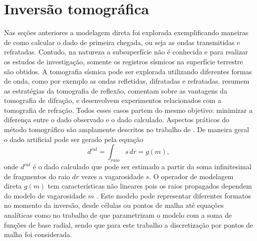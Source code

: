 \section{Inversão tomográfica}

Nas seções anteriores a modelagem direta foi explorada exemplificando maneiras de como calcular o dado de primeira chegada, ou seja as ondas transmitidas e refratadas. Contudo, na natureza a subsuperfície não é conhecida e para realizar os estudos de investigação, somente os registros sísmicos na superfície terrestre são obtidos. A tomografia sísmica pode ser explorada utilizando diferentes formas de onda, como por exemplo as ondas refletidas, difratadas e refratadas.  resumem as estratégias da tomografia de reflexão,  comentam sobre as vantagens da tomografia de difração,  e  desenvolvem experimentos relacionados com a tomografia de refração. Todos esses casos partem do mesmo objetivo: minimizar a diferença entre o dado observado e o dado calculado.  Aspectos práticos do método tomográfico são amplamente descritos no trabalho de . De maneira geral o dado artificial pode ser gerado pela equação
\begin{equation}
	d^{cal} = \displaystyle\int_{raio} s\,dr = g(m),
\end{equation}
\noindent onde $d^{cal}$ é o dado calculado que pode ser estimado a partir da soma infinitesimal de fragmentos do raio $dr$ vezes a vagarosidade $s$. O operador de modelagem direta $g(m)$ tem características não lineares pois os raios propagados dependem do modelo de vagarosidade $m$ \cite{seo2012nonlinear}. Este modelo pode representar diferentes formatos no momento da inversão, desde células ou pontos de malha até equações analíticas como no trabalho de  que parametrizam o modelo com a soma de funções de base radial, sendo que para este trabalho a discretização por pontos de malha foi considerada. 

